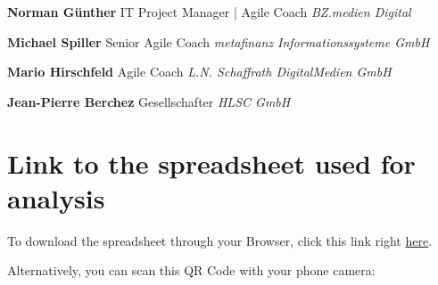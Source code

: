 \textbf{Norman Günther}\newline
{IT Project Manager | Agile Coach}\newline
\textit{BZ.medien Digital}\newline
{}

\textbf{Michael Spiller}\newline
{Senior Agile Coach}\newline
\textit{metafinanz Informationssysteme GmbH}\newline
{}

\textbf{Mario Hirschfeld}\newline
{Agile Coach} \newline
\textit{L.N. Schaffrath DigitalMedien GmbH}

\textbf{Jean-Pierre Berchez}\newline
{Gesellschafter} \newline
\textit{HLSC GmbH}\newline
{}

\newpage
\section{Link to the spreadsheet used for analysis}\label{app:QRCode}
To download the spreadsheet through your Browser, click this link right \textcolor{Violet}{\href{https://github.com/mai-space/mai-joel_maximilian-bachelor_thesis/raw/main/assets/data/data-formated-for-analysis.xlsx}{here}}.

Alternatively, you can scan this QR Code with your phone camera:
\begin{figure}[!ht]
\end{figure}

